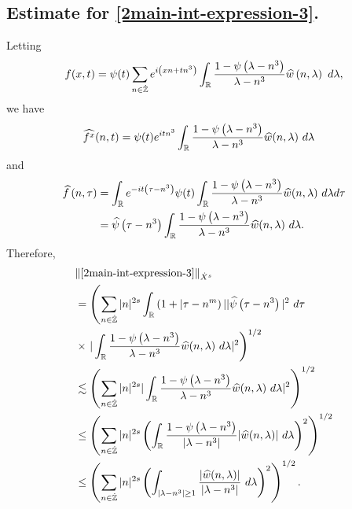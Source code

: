 \subsection{Estimate for \eqref{2main-int-expression-3}.}
Letting $$f(x,t) = \psi(t) \sum_{n \in \dot{\mathbb{Z}}} e^{i\left( xn + tn^{3} \right)} 
\int_{\mathbb{R}} \frac{1 - \psi\left( \lambda - n^{3} \right)}{\lambda - n^{3}} 
\widehat{w} \left( n, \lambda \right) \ d \lambda,$$ we have
%
%
\begin{equation*}
	\begin{split}
		& \widehat{f^x}(n, t) = \psi(t) e^{itn^{3}} \int_{\mathbb{R}}
		\frac{1 - \psi\left( \lambda - n^{3} \right)}{\lambda - n^{3}} 
		\widehat{w}(n, \lambda) \ d \lambda
	\end{split}
\end{equation*}
and
\begin{equation*}
	\begin{split}
		 \widehat{f}\left( n, \tau \right)
		 & = \int_{\mathbb{R}} e^{-it\left( \tau - n^{3} 
		\right)} \psi(t) \int_{\mathbb{R}} \frac{1 - \psi\left( 
		\lambda - n^{3} 
		\right)}{\lambda - n^{3}} \widehat{w}(n, \lambda) \ d \lambda d \tau
		\\
		& = \widehat{\psi}\left( \tau - n^{3} \right) \int_{\mathbb{R}} 
		\frac{1 - \psi\left( 
		\lambda - n^{3} 
		\right)}{\lambda - n^{3}} \widehat{w}(n, \lambda) \ d \lambda.
	\end{split}
\end{equation*}
Therefore,
%
%
\begin{equation*}
	\begin{split}
		& \| \eqref{2main-int-expression-3} \|_{\dot{X}^s} 
		\\
		& = \left( \sum_{n \in \dot{\mathbb{Z}}} |n|^{2s} \int_{\mathbb{R}} \left( 1 + | \tau - n^{m
		} \right ) | | \widehat{\psi}\left( \tau - n^3 \right) |^2 \ d \tau
		\right.
		\\
		& \times \left . |
		\int_{\mathbb{R}} \frac{1 - \psi\left( \lambda - n^3 \right)}{\lambda -
		n^3} \widehat{w}(n, \lambda) \ d \lambda |^2  \right)^{1/2}
		\\
		& \lesssim \left( \sum_{n \in \dot{\mathbb{Z}}} |n|^{2s} | \int_{\mathbb{R}}
		\frac{1 - \psi\left( \lambda - n^3 \right)}{\lambda - n^3}
		\widehat{w}(n, \lambda) \ d\lambda |^2 \right)^{1/2}
		\\
		& \le \left( \sum_{n \in \dot{\mathbb{Z}}} |n|^{2s}  \left ( \int_{\mathbb{R}}
		\frac{1 - \psi\left( \lambda - n^3 \right)}{|\lambda - n^3|}
		|\widehat{w}(n, \lambda) | \ d\lambda \right )^2 \right)^{1/2}
		\\
		& \le \left( \sum_{n \in \dot{\mathbb{Z}}} |n|^{2s}  \left ( \int_{| \lambda - 
		n^3 | \ge 1}
		\frac{|\widehat{w}(n, \lambda) | }{|\lambda - n^3|}
		\ d\lambda \right )^2 \right)^{1/2}.
	\end{split}
\end{equation*}
